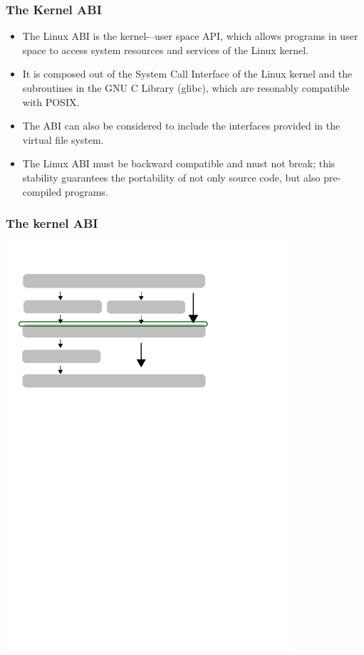 \documentclass{beamer}
\begin{document}
\begin{frame}
\frametitle{The Kernel ABI}
\begin{itemize}
	\item The Linux ABI is the kernel-–user space API, which allows programs in user space to access system resources and services of the Linux kernel.
	\item It is composed out of the System Call Interface of the Linux kernel and the subroutines in the GNU C Library (glibc), which are resonably compatible with POSIX.
	\item The ABI can also be considered to include the interfaces provided in the virtual file system. 

	\item The Linux ABI must be backward compatible and must not break; this stability guarantees the portability of not only source code, but also pre-compiled programs. 
\end{itemize}
\end{frame}

\begin{frame}
\frametitle{The kernel ABI}
\begin{center}
	\includegraphics[width=0.8\textwidth]{kernel}
\end{center}
\end{frame}
\end{document}
